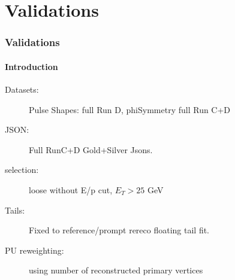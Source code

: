 \documentclass[8pt,serif]{beamer}
\begin{document}
\section{Validations}
\begin{frame}
\frametitle{Validations}
\framesubtitle{Introduction}

\vspace{10mm}


\begin{description}
\item [Datasets:] Pulse Shapes: full Run D, phiSymmetry full Run C+D 
\item [JSON:] Full RunC+D Gold+Silver Jsons.
\item [selection:]  loose without E/p cut, $E_T > 25$ GeV
\item [Tails:] Fixed to reference/prompt rereco floating tail fit. 
\item [PU reweighting:] using number of reconstructed primary vertices
\end{description}
  
\end{frame}
\end{document}
